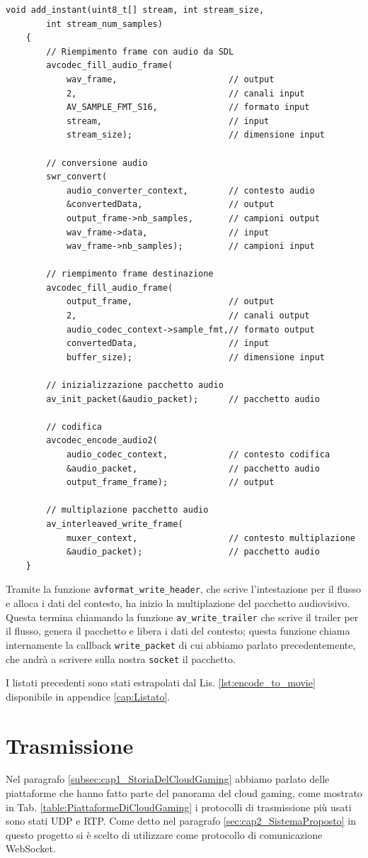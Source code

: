 \begin{lstlisting}[caption=Codice per la codifica audio, label={lst:audioCodecFFmpeg}]
	void add_instant(uint8_t[] stream, int stream_size, 
		int stream_num_samples)
	{
		// Riempimento frame con audio da SDL
		avcodec_fill_audio_frame(
			wav_frame,						// output
			2,								// canali input
			AV_SAMPLE_FMT_S16,				// formato input
			stream,							// input
			stream_size);					// dimensione input			

		// conversione audio
		swr_convert(
			audio_converter_context,		// contesto audio
			&convertedData,					// output
			output_frame->nb_samples,		// campioni output
			wav_frame->data,				// input
			wav_frame->nb_samples);			// campioni input

		// riempimento frame destinazione
		avcodec_fill_audio_frame(
			output_frame, 					// output
			2,								// canali output
			audio_codec_context->sample_fmt,// formato output
			convertedData,					// input
			buffer_size);					// dimensione input			
		
		// inizializzazione pacchetto audio
		av_init_packet(&audio_packet);		// pacchetto audio
		
		// codifica
		avcodec_encode_audio2(
			audio_codec_context,			// contesto codifica
			&audio_packet,					// pacchetto audio
			output_frame_frame);			// output			
		
		// multiplazione pacchetto audio
		av_interleaved_write_frame(
			muxer_context,					// contesto multiplazione
			&audio_packet);					// pacchetto audio
	}
\end{lstlisting}

Tramite la funzione \verb|avformat_write_header|, che scrive l'intestazione per il flusso e alloca i dati del contesto, ha inizio la multiplazione del pacchetto audiovisivo. Questa termina chiamando la funzione \verb|av_write_trailer| che scrive il trailer per il flusso, genera il pacchetto e libera i dati del contesto; questa funzione chiama internamente la callback \verb|write_packet| di cui abbiamo parlato precedentemente, che andrà a scrivere sulla nostra \verb|socket| il pacchetto.

I listati precedenti sono stati estrapolati dal Lis. \ref{lst:encode_to_movie} disponibile in appendice \ref{cap:Listato}.



\section{Trasmissione}
Nel paragrafo \ref{subsec:cap1_StoriaDelCloudGaming} abbiamo parlato delle piattaforme che hanno fatto parte del panorama del cloud gaming, come mostrato in Tab. \ref{table:PiattaformeDiCloudGaming} i protocolli di trasmissione più usati sono stati UDP e RTP. Come detto nel paragrafo \ref{sec:cap2_SistemaProposto} in questo progetto si è scelto di utilizzare come protocollo di comunicazione WebSocket.

